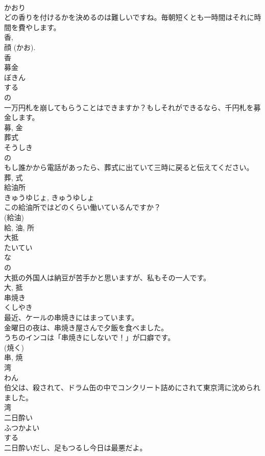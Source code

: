 \documentclass[8pt]{extreport}
\begin{document}
\begin{CJK}{UTF8}{min}
\\	かおり	
\\	どの香りを付けるかを決めるのは難しいですね。毎朝短くとも一時間はそれに時間を費やします。	
\\	香, 
\\	顔 (かお). 
\\	香	
\\	募金	
\\	ぼきん	
\\	する 
\\	の 
\\	一万円札を崩してもらうことはできますか？もしそれができるなら、千円札を募金します。	
\\	募, 金	
\\	葬式	
\\	そうしき	
\\	の 
\\	もし誰かから電話があったら、葬式に出ていて三時に戻ると伝えてください。	
\\	葬, 式	
\\	給油所	
\\	きゅうゆじょ, きゅうゆしょ	
\\	この給油所ではどのくらい働いているんですか？	
\\	(給油) 
\\	給, 油, 所	
\\	大抵	
\\	たいてい	
\\	な 
\\	の 
\\	大抵の外国人は納豆が苦手かと思いますが、私もその一人です。	
\\	大, 抵	
\\	串焼き	
\\	くしやき	
\\	最近、ケールの串焼きにはまっています。	
\\	金曜日の夜は、串焼き屋さんで夕飯を食べました。	
\\	うちのインコは「串焼きにしないで！」が口癖です。	
\\	(焼く) 
\\	串, 焼	
\\	湾	
\\	わん	
\\	伯父は、殺されて、ドラム缶の中でコンクリート詰めにされて東京湾に沈められました。	
\\	湾	
\\	二日酔い	
\\	ふつかよい	
\\	する 
\\	二日酔いだし、足もつるし今日は最悪だよ。	

\end{CJK}
\end{document}
